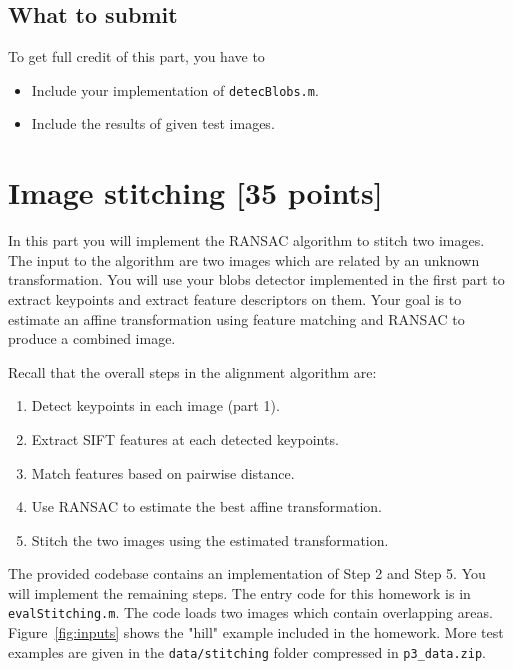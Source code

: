 \documentclass[10pt,letterpaper]{article}
\newcommand{\cmd}[1] {{\color{blue}\texttt{#1}}}
\begin{document}
\subsection{What to submit}
To get full credit of this part, you have to
\begin{itemize}
\item Include your implementation of \cmd{detecBlobs.m}.
\item Include the results of given test images.
\end{itemize}

\newpage

\section{Image stitching [35 points]}

In this part you will implement the RANSAC algorithm to stitch two images. The input to the algorithm are two images which are related by an unknown transformation. You will use your blobs detector implemented in the first part to extract keypoints and extract feature descriptors on them.  Your goal is to estimate an affine transformation using feature matching and RANSAC to produce a combined image. 


Recall that the overall steps in the alignment algorithm are:
\begin{enumerate}
\item Detect keypoints in each image (part 1).
\item Extract SIFT features at each detected keypoints.
\item Match features based on pairwise distance.
\item Use RANSAC to estimate the best affine transformation.
\item Stitch the two images using the estimated transformation.
\end{enumerate}

The provided codebase contains an implementation of Step 2 and Step 5. You will implement the remaining steps. The entry code for this homework is in \cmd{evalStitching.m}.  The code loads two images which contain overlapping areas. Figure~\ref{fig:inputs} shows the "hill" example included in the homework. More test examples are given in the \cmd{data/stitching} folder compressed in \cmd{p3\_data.zip}.
\end{document}
